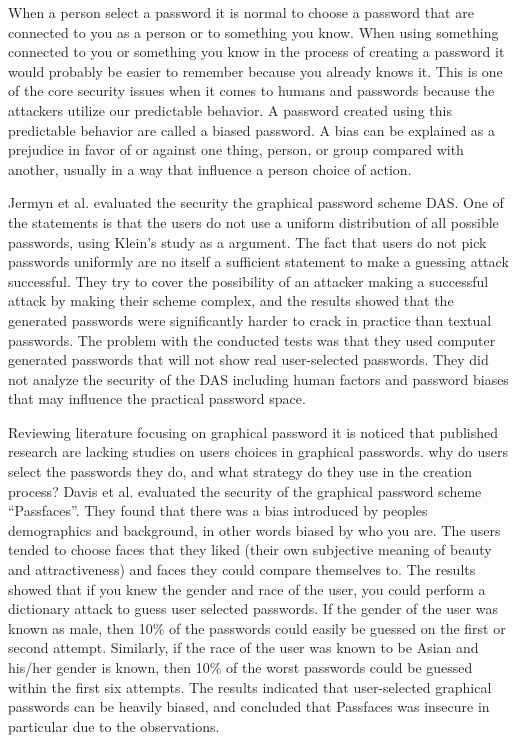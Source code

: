     When a person select a password it is normal to choose a password that are connected to you as a person or to something you know. When using something connected to you or something you know in the process of creating a password it would probably be easier to remember because you already knows it. This is one of the core security issues when it comes to humans and passwords because the attackers utilize our predictable behavior. A password created using this predictable behavior are called a biased password. A bias can be explained as a prejudice in favor of or against one thing, person, or group compared with another, usually in a way that influence a person choice of action. 

    Jermyn et al. \cite{Jermyn} evaluated the security the graphical password scheme DAS. One of the statements is that the users do not use a uniform distribution of all possible passwords, using Klein's study \cite{UnixPasswords} as a argument. The fact that users do not pick passwords uniformly are no itself a sufficient statement to make a guessing attack successful. They try to cover the possibility of an attacker making a successful attack by making their scheme complex, and the results showed that the generated passwords were significantly harder to crack in practice than textual passwords. The problem with the conducted tests was that they used computer generated passwords that will not show real user-selected passwords. They did not analyze the security of the DAS including human factors and password biases that may influence the practical password space.

    Reviewing literature focusing on graphical password it is noticed that published research are lacking studies on users choices in graphical passwords. why do users select the passwords they do, and what strategy do they use in the creation process? Davis et al.\cite{Davis} evaluated the security of the graphical password scheme ``Passfaces''. They found that there was a bias introduced by peoples demographics and background, in other words biased by who you are. The users tended to choose faces that they liked (their own subjective meaning of beauty and attractiveness) and faces they could compare themselves to. The results showed that if you knew the gender and race of the user, you could perform a dictionary attack to guess user selected passwords. If the gender of the user was known as male, then 10\% of the passwords could easily be guessed on the first or second attempt. Similarly, if the race of the user was known to be Asian and his/her gender is known, then 10\% of the worst passwords could be guessed within the first six attempts. The results indicated that user-selected graphical passwords can be heavily biased, and concluded that Passfaces was insecure in particular due to the observations.

